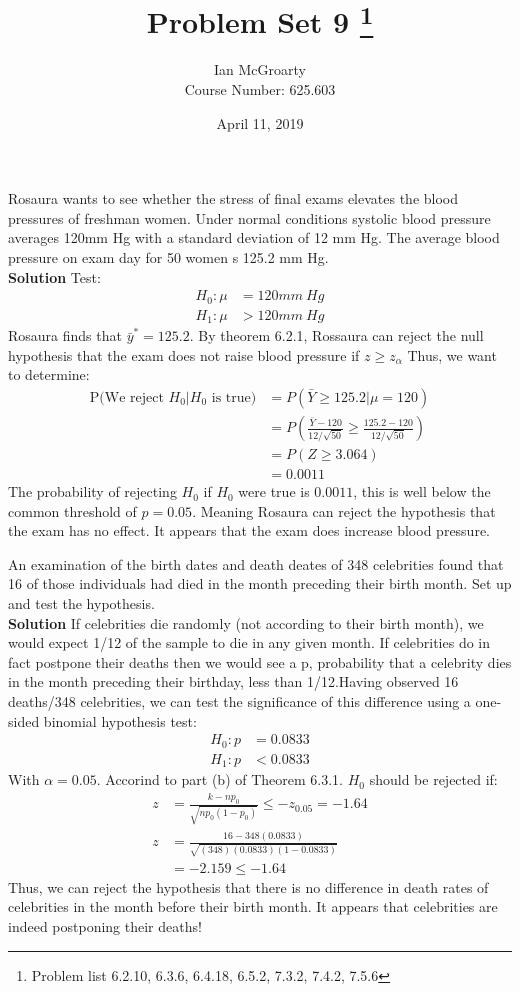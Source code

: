 \documentclass[12pt]{article}
\title{Problem Set 9 \thanks{Problem list 6.2.10, 6.3.6, 6.4.18, 6.5.2, 7.3.2, 7.4.2, 7.5.6}}
\author{Ian McGroarty \\
	Course Number: 625.603}
\date{April 11, 2019}
\newenvironment{problem}[2][Problem]{\begin{trivlist}
\item[\hskip \labelsep {\bfseries #1}\hskip \labelsep {\bfseries #2.}]}{\end{trivlist}}
\begin{document}
\maketitle
\newpage
\begin{problem}{6.2.10} Rosaura wants to see whether the stress of final exams elevates the blood pressures of freshman women. Under normal conditions systolic blood pressure averages 120mm Hg with a standard deviation of 12 mm Hg. The average blood pressure on exam day for 50 women s 125.2 mm Hg.  \\ 
\textbf{Solution} Test: 
\begin{align*}
	H_0: \mu &= 120 mm\  Hg  \\ 
	H_1: \mu  &> 120 mm \ Hg  
\end{align*}
Rosaura finds that $\bar{y}^* = 125.2$. By theorem 6.2.1, Rossaura can reject the null hypothesis that the exam does not raise blood pressure if $z\geq z_{\alpha}$ Thus, we want to determine: 
\begin{align*}
\text{P(We reject $H_0 | H_0$ is true)} &= P(\bar{Y} \geq 125.2 | \mu = 120) \\
	&= P(\frac{\bar{Y} - 120}{12/\sqrt{50}} \geq \frac{125.2-120}{12/\sqrt{50}}) \\ 
	&= P(Z \geq 3.064) \\
	&= 0.0011
\end{align*}
The probability of rejecting $H_0$ if $H_0$ were true is $0.0011$, this is well below the common threshold of $p=0.05$. Meaning Rosaura can reject the hypothesis that the exam has no effect. It appears that the exam does increase blood pressure.  
\end{problem}

\begin{problem}{6.3.6} An examination of the birth dates and death deates of 348 celebrities found that 16 of those individuals had died in the month preceding their birth month.  Set up and test the hypothesis. \\
\textbf{Solution} If celebrities die randomly (not according to their birth month), we would expect 1/12 of the sample to die in any given month. If celebrities do in fact postpone their deaths then we would see a p, probability that a celebrity dies in the month preceding their birthday, less than 1/12.Having observed 16 deaths/348 celebrities, we can test the significance of this difference using a one-sided binomial hypothesis test: 
\begin{align*}
	H_0: p &= 0.0833 \\
	H_1: p &< 0.0833
\end{align*}
With $\alpha = 0.05$. Accorind to part (b) of Theorem 6.3.1. $H_0$ should be rejected if:
\begin{align*}
	z &= \frac{k-np_0}{\sqrt{np_0(1-p_0)}} \leq -z_{0.05}=-1.64 \\
	z&=\frac{16-348(0.0833)}{\sqrt{(348)(0.0833)(1-0.0833)}} \\
	&= -2.159 \leq -1.64 
\end{align*} 
Thus, we can reject the hypothesis that there is no difference in death rates of celebrities in the month before their birth month. It appears that celebrities are indeed postponing their deaths!
\end{problem}
\end{document}
